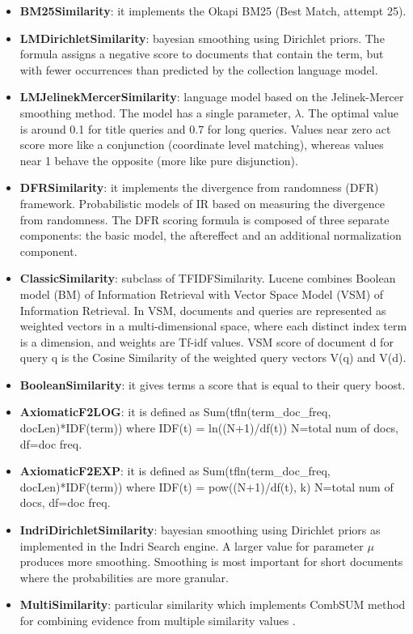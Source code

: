 \begin{itemize}
    \item \textbf{BM25Similarity}: it implements the Okapi BM25 (Best Match, attempt 25).
    \item \textbf{LMDirichletSimilarity}: bayesian smoothing using Dirichlet priors. The formula assigns a negative score to documents that contain the term, but with fewer occurrences than predicted by the collection language model.
    \item \textbf{LMJelinekMercerSimilarity}: language model based on the Jelinek-Mercer smoothing method. The model has a single parameter, $\lambda$. The optimal value is around 0.1 for title queries and 0.7 for long queries. Values near zero act score more like a conjunction (coordinate level matching), whereas values near 1 behave the opposite (more like pure disjunction).
    \item \textbf{DFRSimilarity}: it implements the divergence from randomness (DFR) framework. Probabilistic models of IR based on measuring the divergence from randomness. The DFR scoring formula is composed of three separate components: the basic model, the aftereffect and an additional normalization component.
    \item \textbf{ClassicSimilarity}: subclass of TFIDFSimilarity. Lucene combines Boolean model (BM) of Information Retrieval with Vector Space Model (VSM) of Information Retrieval. In VSM, documents and queries are represented as weighted vectors in a multi-dimensional space, where each distinct index term is a dimension, and weights are Tf-idf values. VSM score of document d for query q is the Cosine Similarity of the weighted query vectors V(q) and V(d).
    \item \textbf{BooleanSimilarity}: it gives terms a score that is equal to their query boost.
    \item \textbf{AxiomaticF2LOG}: it is defined as Sum(tfln(term\_doc\_freq, docLen)*IDF(term)) where IDF(t) = ln((N+1)/df(t)) N=total num of docs, df=doc freq.
    \item \textbf{AxiomaticF2EXP}: it is defined as Sum(tfln(term\_doc\_freq, docLen)*IDF(term)) where IDF(t) = pow((N+1)/df(t), k) N=total num of docs, df=doc freq.
    \item \textbf{IndriDirichletSimilarity}: bayesian smoothing using Dirichlet priors as implemented in the Indri Search engine. A larger value for parameter $\mu$ produces more smoothing. Smoothing is most important for short documents where the probabilities are more granular.
    \item \textbf{MultiSimilarity}: particular similarity which implements CombSUM method for combining evidence from multiple similarity values \cite{multisim}.
\end{itemize}
